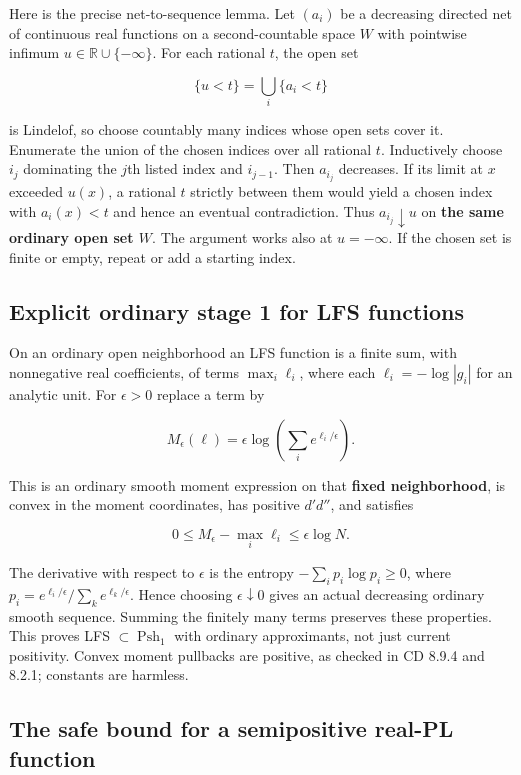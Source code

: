 \documentclass[
  11pt,
]{article}
\begin{document}
Here is the precise net-to-sequence lemma. Let \((a_i)\) be a decreasing
directed net of continuous real functions on a second-countable space
\(W\) with pointwise infimum \(u\in\mathbb R\cup\{-\infty\}\). For each
rational \(t\), the open set

\[
\{u<t\}=\bigcup_i\{a_i<t\}
\]

is Lindelof, so choose countably many indices whose open sets cover it.
Enumerate the union of the chosen indices over all rational \(t\).
Inductively choose \(i_j\) dominating the \(j\)th listed index and
\(i_{j-1}\). Then \(a_{i_j}\) decreases. If its limit at \(x\) exceeded
\(u(x)\), a rational \(t\) strictly between them would yield a chosen
index with \(a_i(x)<t\) and hence an eventual contradiction. Thus
\(a_{i_j}\downarrow u\) on \textbf{the same ordinary open set \(W\)}.
The argument works also at \(u=-\infty\). If the chosen set is finite or
empty, repeat or add a starting index.

\subsection{Explicit ordinary stage 1 for LFS
functions}\label{explicit-ordinary-stage-1-for-lfs-functions}

On an ordinary open neighborhood an LFS function is a finite sum, with
nonnegative real coefficients, of terms \(\max_i\ell_i\), where each
\(\ell_i=-\log|g_i|\) for an analytic unit. For \(\epsilon>0\) replace a
term by

\[
M_\epsilon(\ell)=\epsilon\log\left(\sum_i e^{\ell_i/\epsilon}\right).
\]

This is an ordinary smooth moment expression on that \textbf{fixed
neighborhood}, is convex in the moment coordinates, has positive
\(d'd''\), and satisfies

\[
0\leq M_\epsilon-\max_i\ell_i\leq\epsilon\log N.
\]

The derivative with respect to \(\epsilon\) is the entropy
\(-\sum_i p_i\log p_i\geq0\), where
\(p_i=e^{\ell_i/\epsilon}/\sum_k e^{\ell_k/\epsilon}\). Hence choosing
\(\epsilon\downarrow0\) gives an actual decreasing ordinary smooth
sequence. Summing the finitely many terms preserves these properties.
This proves LFS \(\subset\operatorname{Psh}_1\) with ordinary
approximants, not just current positivity. Convex moment pullbacks are
positive, as checked in CD 8.9.4 and 8.2.1; constants are harmless.

\subsection{The safe bound for a semipositive real-PL
function}\label{the-safe-bound-for-a-semipositive-real-pl-function}
\end{document}
